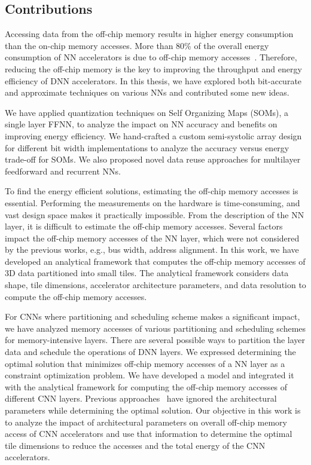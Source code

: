 \subsection{Contributions}
Accessing data from the off-chip memory results in higher energy consumption than the on-chip memory accesses. More than 80\% of the overall energy consumption of NN accelerators is due to off-chip memory accesses~\cite{chen2014diannao}. Therefore, reducing the off-chip memory is the key to improving the throughput and energy efficiency of DNN accelerators. In this thesis, we have explored both bit-accurate and approximate techniques on various NNs and contributed some new ideas.

We have applied quantization techniques on Self Organizing Maps (SOMs), a single layer FFNN, to analyze the impact on NN accuracy and benefits on improving energy efficiency. We hand-crafted a custom semi-systolic array design for different bit width implementations to analyze the accuracy versus energy trade-off for SOMs. We also proposed novel data reuse approaches for multilayer feedforward and recurrent NNs. 

To find the energy efficient solutions, estimating the off-chip memory accesses is essential. Performing the measurements on the hardware is time-consuming, and vast design space makes it practically impossible. From the description of the NN layer, it is difficult to estimate the off-chip memory accesses. Several factors impact the off-chip memory accesses of the NN layer, which were not considered by the previous works, e.g., bus width, address alignment. In this work, we have developed an analytical framework that computes the off-chip memory accesses of 3D data partitioned into small tiles. The analytical framework considers data shape, tile dimensions, accelerator architecture parameters, and data resolution to compute the off-chip memory accesses.

For CNNs where partitioning and scheduling scheme makes a significant impact, we have analyzed memory accesses of various partitioning and scheduling schemes for memory-intensive layers. There are several possible ways to partition the layer data and schedule the operations of DNN layers. We expressed determining the optimal solution that minimizes off-chip memory accesses of a NN layer as a constraint optimization problem. We have developed a model and integrated it with the analytical framework for computing the off-chip memory accesses of different CNN layers. Previous approaches~\cite{zhang2015optimizing, Li2018SmartShuttleOO} have ignored the architectural parameters while determining the optimal solution. Our objective in this work is to analyze the impact of architectural parameters on overall off-chip memory access of CNN accelerators and use that information to determine the optimal tile dimensions to reduce the accesses and the total energy of the CNN accelerators.


